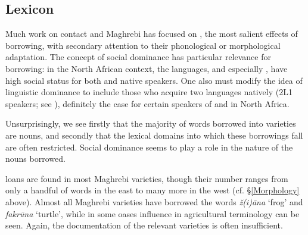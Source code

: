 \documentclass[output=paper]{langsci/langscibook}
\begin{document}
\subsection{Lexicon}\label{lexicon}

Much work on contact and Maghrebi  has focused on , the most salient effects of borrowing, with secondary attention to their phonological or morphological adaptation. The concept of social dominance has particular relevance for borrowing: in the North African context, the  languages, and especially , have high social status for both  and  native speakers. One also must modify the idea of linguistic dominance to include those who acquire two languages natively (2L1 speakers; see \citealt[525]{Lucas2015}), definitely the case for certain speakers of  and  in North Africa.

  Unsurprisingly, we see firstly that the majority of words borrowed into  varieties are nouns, and secondly that the lexical domains into which these borrowings fall are often restricted. Social dominance seems to play a role in the nature of the nouns borrowed.

   loans are found in most Maghrebi  varieties, though their number ranges from only a handful of words in the east to many more in the west (cf. §\ref{Morphology} above). Almost all Maghrebi varieties have borrowed the words \textit{ž(i){\R}āna} ‘frog’ and \textit{fakrūna} ‘turtle’, while in some oases  influence in agricultural terminology can be seen. Again, the documentation of the relevant varieties is often insufficient.
\end{document}
